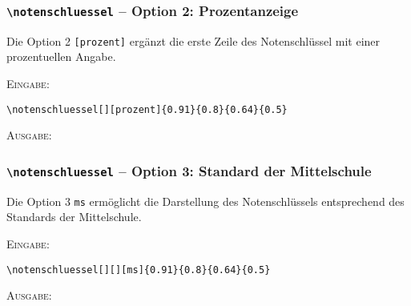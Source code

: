 \documentclass[a4paper,12pt]{article}
\begin{document}
\subsubsection*{\texttt{\textbackslash notenschluessel} -- Option 2: Prozentanzeige}

Die Option 2 \texttt{[prozent]} ergänzt die erste Zeile des Notenschlüssel mit einer prozentuellen Angabe.

\textsc{Eingabe:}
\begin{verbatim}
\notenschluessel[][prozent]{0.91}{0.8}{0.64}{0.5}
\end{verbatim}

\textsc{Ausgabe:}

\subsubsection*{\texttt{\textbackslash notenschluessel} -- Option 3: Standard der Mittelschule}

Die Option 3 \texttt{ms} ermöglicht die Darstellung des Notenschlüssels entsprechend des Standards der Mittelschule.

\textsc{Eingabe:}
\begin{verbatim}
\notenschluessel[][][ms]{0.91}{0.8}{0.64}{0.5}
\end{verbatim}

\textsc{Ausgabe:}

%
%

%
%
%
\end{document}
